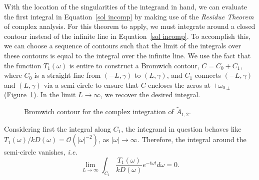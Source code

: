 \documentclass[12pt]{../style-files/ociamthesis}
\begin{document}
With the location of the singularities of the integrand in hand, we can evaluate the first integral in Equation~\eqref{sol incomp} by making use of the \textit{Residue Theorem} of complex analysis. For this theorem to apply, we must integrate around a closed contour instead of the infinite line in Equation~\eqref{sol incomp}. To accomplish this, we can choose a sequence of contours such that the limit of the integrals over these contours is equal to the integral over the infinite line. We use the fact that the function $T_1(\omega)$ is entire to construct a Bromwich contour, $C = C_0 + C_1$, where $C_0$ is a straight line from $(-L, \gamma)$ to $(L, \gamma)$, and $C_1$ connects $(-L, \gamma)$ and $(L, \gamma)$ via a semi-circle to ensure that $C$ encloses the zeros at $\pm\omega_{0\pm}$ (Figure~\ref{fig: brom cont incomp}). In the limit $L \to \infty$, we recover the desired integral.

\begin{figure}
	\centering
	\caption{Bromwich contour for the complex integration of $\tilde{A}_{1,2}$.}
	\label{fig: brom cont incomp}
\end{figure}
Considering first the integral along $C_1$, the integrand in question behaves like $T_1(\omega)/kD(\omega) = \mathcal{O}(|\omega|^{-2})$, as $|\omega| \to \infty$. Therefore, the integral around the semi-circle vanishes, \textit{i.e.}
\begin{equation}
\lim_{L \to \infty} \int_{C_1} \frac{T_1(\omega)}{kD(\omega)} e^{-i\omega t} d\omega = 0.
\end{equation}
\end{document}
